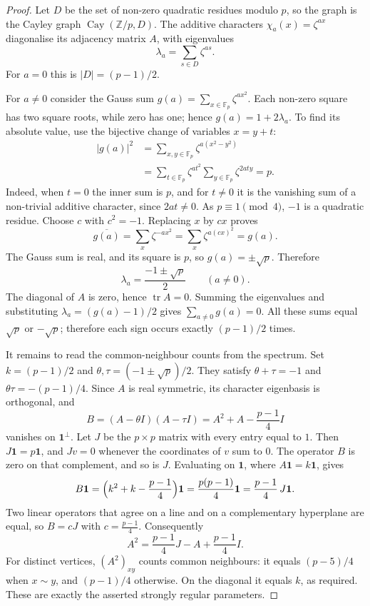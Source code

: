 \begin{proof}
Let $D$ be the set of non-zero quadratic residues
modulo $p$, so the graph is the Cayley graph
$\operatorname{Cay}(\mathbb Z/p,D)$.
The additive characters $\chi_a(x)=\zeta^{ax}$
diagonalise its adjacency matrix $A$, with
eigenvalues
\[
\lambda_a=\sum_{s\in D}\zeta^{as}.
\]
For $a=0$ this is $|D|=(p-1)/2$.

For $a\ne0$ consider the Gauss sum
$g(a)=\sum_{x\in\mathbb F_p}\zeta^{ax^2}$.
Each non-zero square has two square roots,
while zero has one; hence
$g(a)=1+2\lambda_a$.
To find its absolute value, use the
bijective change of variables $x=y+t$:
\[
\begin{aligned}
|g(a)|^2
 &=\sum_{x,y\in\mathbb F_p}
          \zeta^{a(x^2-y^2)}\\
 &=\sum_{t\in\mathbb F_p}\zeta^{at^2}
       \sum_{y\in\mathbb F_p}\zeta^{2aty}=p.
\end{aligned}
\]
Indeed, when $t=0$ the inner sum is $p$,
and for $t\ne0$ it is the vanishing sum
of a non-trivial additive character,
since $2at\ne0$. As $p\equiv1\pmod4$,
$-1$ is a quadratic residue. Choose
$c$ with $c^2=-1$. Replacing $x$ by
$cx$ proves
\[
\overline{g(a)}
=\sum_x\zeta^{-ax^2}
=\sum_x\zeta^{a(cx)^2}=g(a).
\]
The Gauss sum is real, and its square
is $p$, so $g(a)=\pm\sqrt p$. Therefore
\[
\lambda_a=\frac{-1\pm\sqrt p}{2}
\qquad(a\ne0).
\]
The diagonal of $A$ is zero, hence
$\operatorname{tr}A=0$. Summing the
eigenvalues and substituting
$\lambda_a=(g(a)-1)/2$ gives
$\sum_{a\ne0}g(a)=0$.
All these sums equal $\sqrt p$
or $-\sqrt p$; therefore each sign
occurs exactly $(p-1)/2$ times.

It remains to read the common-neighbour
counts from the spectrum. Set
$k=(p-1)/2$ and
$\theta,\tau=(-1\pm\sqrt p)/2$.
They satisfy $\theta+\tau=-1$ and
$\theta\tau=-(p-1)/4$. Since $A$ is
real symmetric, its character eigenbasis
is orthogonal, and
\[
B=(A-\theta I)(A-\tau I)
  =A^2+A-\frac{p-1}{4}I
\]
vanishes on $\mathbf1^\perp$.
Let $J$ be the $p\times p$ matrix with every entry equal to $1$. Then $J\mathbf1=p\mathbf1$, and $Jv=0$ whenever the coordinates of $v$ sum to $0$. The operator $B$ is zero on that complement, and so is $J$. Evaluating on $\mathbf1$, where $A\mathbf1=k\mathbf1$, gives
\[
B\mathbf1=\Bigl(k^2+k-\frac{p-1}{4}\Bigr)\mathbf1=\frac{p(p-1)}4\mathbf1=\frac{p-1}4\,J\mathbf1.
\]
Two linear operators that agree on a line and on a complementary hyperplane are equal, so $B=cJ$ with $c=\frac{p-1}4$.
Consequently
\[
A^2=\frac{p-1}4J-A+\frac{p-1}4I.
\]
For distinct vertices, $(A^2)_{xy}$
counts common neighbours: it equals
$(p-5)/4$ when $x\sim y$, and
$(p-1)/4$ otherwise. On the diagonal
it equals $k$, as required. These are
exactly the asserted strongly regular
parameters.
\end{proof}

